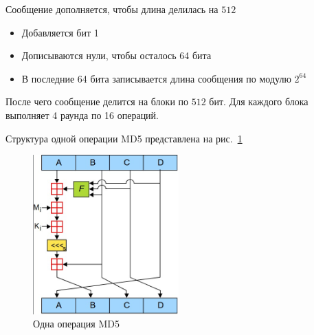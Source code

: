 \documentclass[a4paper, 14pt]{extarticle}
\begin{document}
Сообщение дополняется, чтобы длина делилась на $512$
\begin{itemize}
    \item Добавляется бит 1
    \item Дописываются нули, чтобы осталось 64 бита
    \item В последние 64 бита записывается длина сообщения по модулю $2^{64}$\\
\end{itemize}

После чего сообщение делится на блоки по $512$ бит. Для каждого блока выполняет 4 раунда по 16 операций.

Структура одной операции MD5 представлена на рис.~\ref{img:md5}

\begin{figure}[h]
    \centering
    \includegraphics[width=0.5\textwidth]{img/S001.jpg}
    \caption{Одна операция MD5}%
    \label{img:md5}
\end{figure}

\FloatBarrier{}
\end{document}
